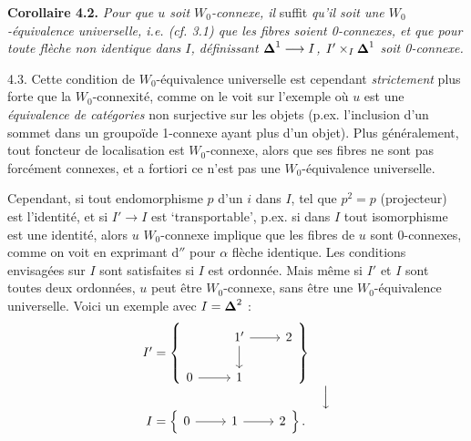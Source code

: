 \textbf{Corollaire 4.2.} \textit{Pour que $u$ soit $W_0$-connexe, il} suffit \textit{qu'il soit une $W_0$-équivalence universelle, i.e. (cf. 3.1) que les fibres soient \textup{0}-connexes, et que pour toute flèche non identique dans $I$, définissant $\boldsymbol{\Delta}^1 \longrightarrow I$, $I' \times_I \boldsymbol{\Delta}^1$ soit \textup{0}-connexe.}

4.3. Cette condition de $W_0$-équivalence universelle est cependant \textit{strictement} plus forte que la $W_0$-connexité, comme on le voit sur l'exemple où $u$ est une \textit{équivalence de catégories} non surjective sur les objets (p.ex. l'inclusion d'un sommet dans un groupoïde 1-connexe ayant plus d'un objet). Plus généralement, tout foncteur de localisation est $W_0$-connexe, alors que ses fibres ne sont pas forcément connexes, et a fortiori ce n'est pas une $W_0$-équivalence universelle.

Cependant, si tout endomorphisme $p$ d'un $i$ dans $I$, tel que $p^2 = p$ (projecteur) est l'identité, et si $I' \longrightarrow I$ est `transportable', p.ex. si dans $I$ tout isomorphisme est une identité, alors $u$ $W_0$-connexe implique que les fibres de $u$ sont 0-connexes, comme on voit en exprimant d$''$ pour $\alpha$ flèche identique. Les conditions envisagées sur $I$ sont satisfaites si $I$ est ordonnée. Mais même si $I'$ et $I$ sont toutes deux ordonnées, $u$ peut être $W_0$-connexe, sans être une $W_0$-équivalence universelle. Voici un exemple avec $I = \boldsymbol{\Delta}^2$ :
\[
\begin{array}{r@{\;}l@{\quad}c}
I' = & \left\{\begin{tikzcd}[ampersand replacement=\&]
 \& 1' \arrow[r] \arrow[d] \& 2 \\
0 \arrow[r] \& 1 \&
\end{tikzcd}\right\} & \\[1ex]
 & & \Big\downarrow \\[1ex]
I = & \left\{\begin{tikzcd}[ampersand replacement=\&]
0 \arrow[r] \& 1 \arrow[r] \& 2
\end{tikzcd}\right\}. &
\end{array}
\]

